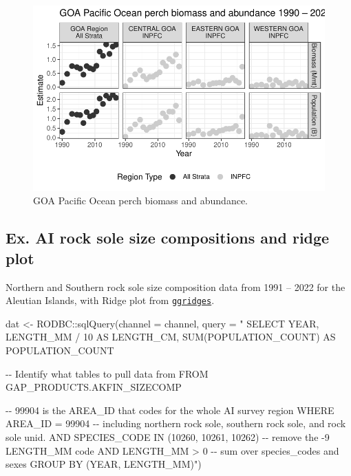 \documentclass[
  letterpaper,
  oneside,
  open=any]{scrbook}
\newenvironment{Shaded}{\begin{snugshade}}{\end{snugshade}}
\newcommand{\AttributeTok}[1]{\textcolor[rgb]{0.40,0.45,0.13}{#1}}
\newcommand{\FunctionTok}[1]{\textcolor[rgb]{0.28,0.35,0.67}{#1}}
\newcommand{\NormalTok}[1]{\textcolor[rgb]{0.00,0.23,0.31}{#1}}
\newcommand{\OtherTok}[1]{\textcolor[rgb]{0.00,0.23,0.31}{#1}}
\newcommand{\SpecialCharTok}[1]{\textcolor[rgb]{0.37,0.37,0.37}{#1}}
\newcommand{\StringTok}[1]{\textcolor[rgb]{0.13,0.47,0.30}{#1}}
\begin{document}
\begin{figure}[H]

{\centering \includegraphics{content/akfin-oracle-sql-r_files/figure-pdf/test-1-plot-1.pdf}

}

\caption{GOA Pacific Ocean perch biomass and abundance.}

\end{figure}%

\subsection{Ex. AI rock sole size compositions and ridge
plot}\label{ex.-ai-rock-sole-size-compositions-and-ridge-plot}

Northern and Southern rock sole size composition data from 1991 -- 2022
for the Aleutian Islands, with Ridge plot from
\href{https://cran.r-project.org/web/packages/ggridges/vignettes/introduction.html}{\texttt{ggridges}}.

\begin{Shaded}
\begin{Highlighting}[]
\NormalTok{dat }\OtherTok{\textless{}{-}}\NormalTok{ RODBC}\SpecialCharTok{::}\FunctionTok{sqlQuery}\NormalTok{(}\AttributeTok{channel =}\NormalTok{ channel, }
                       \AttributeTok{query =} \StringTok{"}
\StringTok{SELECT }
\StringTok{YEAR,}
\StringTok{LENGTH\_MM / 10 AS LENGTH\_CM, }
\StringTok{SUM(POPULATION\_COUNT) AS POPULATION\_COUNT}

\StringTok{{-}{-} Identify what tables to pull data from}
\StringTok{FROM GAP\_PRODUCTS.AKFIN\_SIZECOMP }

\StringTok{{-}{-} 99904 is the AREA\_ID that codes for the whole AI survey region}
\StringTok{WHERE AREA\_ID = 99904}
\StringTok{{-}{-} including northern rock sole, southern rock sole, and rock sole unid.}
\StringTok{AND SPECIES\_CODE IN (10260, 10261, 10262)}
\StringTok{{-}{-} remove the {-}9 LENGTH\_MM code}
\StringTok{AND LENGTH\_MM \textgreater{} 0}
\StringTok{{-}{-} sum over species\_codes and sexes}
\StringTok{GROUP BY (YEAR, LENGTH\_MM)"}\NormalTok{)}
\end{Highlighting}
\end{Shaded}
\end{document}
